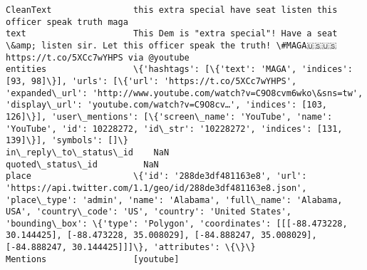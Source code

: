 \documentclass[11pt]{article}
\begin{document}
\begin{Verbatim}[commandchars=\\\{\}]
CleanText                this extra special have seat listen this officer speak truth maga                                                                                                                                                                                                                                                                                                                                   
text                     This Dem is "extra special"! Have a seat \&amp; listen sir. Let this officer speak the truth! \#MAGA🇺🇸🇺🇸 https://t.co/5XCc7wYHPS via @youtube                                                                                                                                                                                                                                                         
entities                 \{'hashtags': [\{'text': 'MAGA', 'indices': [93, 98]\}], 'urls': [\{'url': 'https://t.co/5XCc7wYHPS', 'expanded\_url': 'http://www.youtube.com/watch?v=C9O8cvm6wko\&sns=tw', 'display\_url': 'youtube.com/watch?v=C9O8cv…', 'indices': [103, 126]\}], 'user\_mentions': [\{'screen\_name': 'YouTube', 'name': 'YouTube', 'id': 10228272, 'id\_str': '10228272', 'indices': [131, 139]\}], 'symbols': []\}         
in\_reply\_to\_status\_id    NaN                                                                                                                                                                                                                                                                                                                                                                                                 
quoted\_status\_id         NaN                                                                                                                                                                                                                                                                                                                                                                                                 
place                    \{'id': '288de3df481163e8', 'url': 'https://api.twitter.com/1.1/geo/id/288de3df481163e8.json', 'place\_type': 'admin', 'name': 'Alabama', 'full\_name': 'Alabama, USA', 'country\_code': 'US', 'country': 'United States', 'bounding\_box': \{'type': 'Polygon', 'coordinates': [[[-88.473228, 30.144425], [-88.473228, 35.008029], [-84.888247, 35.008029], [-84.888247, 30.144425]]]\}, 'attributes': \{\}\}
Mentions                 [youtube]                                                                                                                                                                                                                                                                                                                                                                                           

\end{Verbatim}
\end{document}

